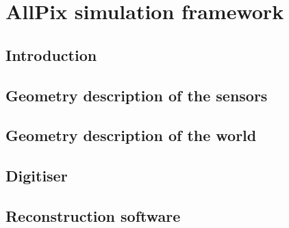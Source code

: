 \chapter{AllPix simulation framework}
\label{ch:AllPix}

\section{Introduction}
\section{Geometry description of the sensors}
\section{Geometry description of the world}
\section{Digitiser}
\section{Reconstruction software}